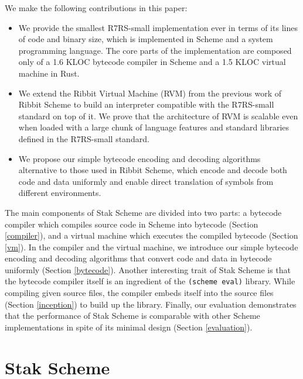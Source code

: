 \documentclass[sigplan]{acmart}
\begin{document}
We make the following contributions in this paper:

\begin{itemize}
  \item We provide the smallest R7RS-small implementation ever in
    terms of its lines of code and binary size, which is implemented
    in Scheme and a system programming language.
    The core parts of the implementation are composed only of a 1.6 KLOC
    bytecode compiler in Scheme and a 1.5 KLOC virtual machine in Rust.
  \item We extend the Ribbit Virtual Machine (RVM) from the previous
    work of Ribbit Scheme to build an interpreter compatible with the
    R7RS-small standard on top of it.
    We prove that the architecture of RVM is scalable even when
    loaded with a large chunk of language features and standard
    libraries defined in the R7RS-small standard.
  \item We propose our simple bytecode encoding and decoding algorithms
    alternative to those used in Ribbit Scheme, which encode and
    decode both code and data uniformly and enable direct translation
    of symbols from different environments.
\end{itemize}

The main components of Stak Scheme are divided into two parts:
a bytecode compiler which compiles source code in Scheme into
bytecode (Section \ref{compiler}),
and a virtual machine which executes the compiled bytecode
(Section \ref{vm}).
In the compiler and the virtual machine, we introduce our simple
bytecode encoding and
decoding algorithms that convert code and data in bytecode
uniformly (Section \ref{bytecode}).
Another interesting trait of Stak Scheme is that the bytecode compiler itself
is an ingredient of the \texttt{(scheme eval)} library.
While compiling given source files, the compiler embeds itself
into the source files (Section \ref{inception}) to build up the library.
Finally, our evaluation demonstrates that the performance of Stak Scheme is
comparable with other Scheme implementations in spite of its minimal
design (Section \ref{evaluation}).

\section{Stak Scheme} \label{stak}
\end{document}

